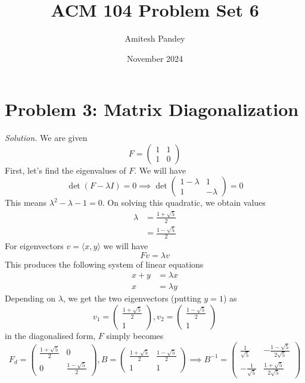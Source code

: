 \documentclass{article}
\title{ACM 104 Problem Set 6}
\author{Amitesh Pandey}
\date{November 2024}
\begin{document}
\maketitle
\section*{Problem 3: Matrix Diagonalization}
\emph{Solution. } We are given
\begin{equation*}
    F = \begin{pmatrix}
        1 & 1\\
        1 & 0
    \end{pmatrix}
\end{equation*}
First, let's find the eigenvalues of $F$. We will have 
\begin{equation*}
    \det(F - \lambda I) = 0 \implies \det \begin{pmatrix}
        1 - \lambda & 1\\
        1 & -\lambda
    \end{pmatrix} = 0
\end{equation*}
This means $\lambda^2 - \lambda - 1= 0$. On solving this quadratic, we obtain values
\begin{align*}
    \lambda &= \frac{1 + \sqrt{5}}{2}\\
    &= \frac{1 - \sqrt{5}}{2}
\end{align*}
For eigenvectors $v = \langle x, y\rangle$ we will have
\begin{equation*}
    F v = \lambda v
\end{equation*}
This produces the following system of linear equations
\begin{align*}
    x + y &= \lambda x\\
    x &= \lambda y
\end{align*}
Depending on $\lambda$, we get the two eigenvectors (putting $y = 1$) as
\begin{equation*}
    v_{1} = \begin{pmatrix}
        \frac{1 + \sqrt{5}}{2}\\
        1
    \end{pmatrix},  v_{2} = \begin{pmatrix}
        \frac{1 - \sqrt{5}}{2}\\
        1
    \end{pmatrix}
\end{equation*}
 in the diagonalised form, $F$ simply becomes
\begin{equation*}
    F_{d} = \begin{pmatrix}
        \frac{1 + \sqrt{5}}{2} & 0\\
        0 & \frac{1 - \sqrt{5}}{2}
    \end{pmatrix}, B = \begin{pmatrix}
    \frac{1 + \sqrt{5}}{2} & \frac{1 - \sqrt{5}}{2}\\
    1 & 1
    \end{pmatrix} \implies B^{-1} = \begin{pmatrix}
        \frac{1}{\sqrt{5}} & -\frac{1-\sqrt{5}}{2 \sqrt{5}} \\
-\frac{1}{\sqrt{5}} & \frac{1+\sqrt{5}}{2 \sqrt{5}}
    \end{pmatrix}
\end{equation*}
\end{document}

